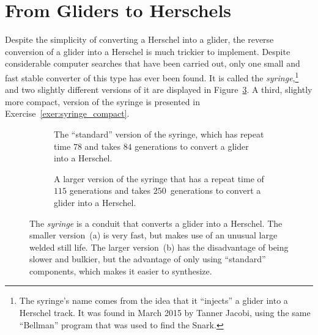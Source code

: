 \section{From Gliders to Herschels}\label{sec:g_to_h}

Despite the simplicity of converting a Herschel into a glider, the reverse conversion of a glider into a Herschel is much trickier to implement. Despite considerable computer searches that have been carried out, only one small and fast stable converter of this type has ever been found. It is called the \emph{syringe},\footnote{The syringe's name comes from the idea that it ``injects'' a glider into a Herschel track. It was found in March 2015 by Tanner Jacobi, using the same ``Bellman'' program that was used to find the Snark.} and two slightly different versions of it are displayed in Figure~\ref{fig:syringe}. A third, slightly more compact, version of the syringe is presented in Exercise~\ref{exer:syringe_compact}.

\begin{figure}[!htb]
	\centering
	\begin{subfigure}{.33\textwidth}
		\centering{}
		\caption{The ``standard'' version of the syringe, which has repeat time $78$ and takes $84$ generations to convert a glider into a Herschel.}\label{fig:syringe_main}
	\end{subfigure} \hfill %
	\begin{subfigure}{.635\textwidth}
		\centering{}
		\caption{A larger version of the syringe that has a repeat time of $115$ generations and takes $250$~generations to convert a glider into a Herschel.}
		\label{fig:syringe_modified}
	\end{subfigure}
	\caption{The \emph{syringe} is a conduit that converts a glider into a Herschel. The smaller version~(a) is very fast, but makes use of an unusual large welded still life. The larger version~(b) has the disadvantage of being slower and bulkier, but the advantage of only using ``standard'' components, which makes it easier to synthesize.}\label{fig:syringe}
\end{figure}


